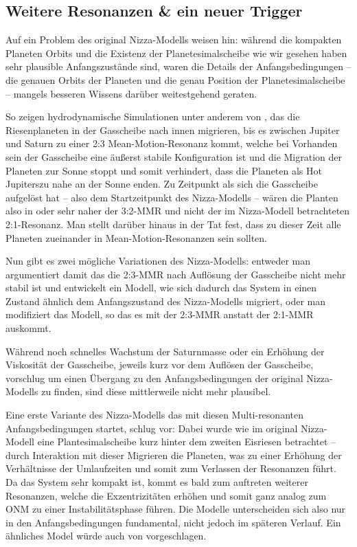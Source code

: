 \documentclass[12pt,a4paper,twoside]{article}
\renewcommand{\cite}{\citep}
\begin{document}
\subsection{Weitere Resonanzen \& ein neuer Trigger}\label{Nizza2}
Auf ein Problem des original Nizza-Modells weisen \cite{Morbidelli2007a} hin: während die kompakten Planeten Orbits und die Existenz der Planetesimalscheibe wie wir gesehen haben sehr plausible Anfangszustände sind, waren die Details der Anfangsbedingungen -- die genauen Orbits der Planeten und die genau Position der Planetesimalscheibe -- mangels besseren Wissens darüber weitestgehend geraten.

So zeigen hydrodynamische Simulationen unter anderem von \cite{Morbidelli2007a}, das die Riesenplaneten in der Gasscheibe nach innen migrieren, bis es zwischen Jupiter und Saturn zu einer 2:3 Mean-Motion-Resonanz kommt, welche bei Vorhanden sein der Gasscheibe eine äußerst stabile Konfiguration ist und die Migration der Planeten zur Sonne stoppt und somit verhindert, dass die Planeten als \glqq Hot Jupiters\grqq zu nahe an der Sonne enden\cite{Morbidelli2007a}.
Zu Zeitpunkt als sich die Gasscheibe aufgelöst hat -- also dem Startzeitpunkt des Nizza-Modells -- wären die Planten also in oder sehr naher der 3:2-MMR und nicht der im Nizza-Modell betrachteten 2:1-Resonanz.
Man stellt darüber hinaus in der Tat fest, dass zu dieser Zeit alle Planeten zueinander in Mean-Motion-Resonanzen sein sollten.

Nun gibt es zwei mögliche Variationen des Nizza-Modells: entweder man argumentiert damit das die 2:3-MMR nach Auflösung der Gasscheibe nicht mehr stabil ist und entwickelt ein Modell, wie sich dadurch das System in einen Zustand ähnlich dem Anfangszustand des Nizza-Modells migriert, oder man modifiziert das Modell, so das es mit der  2:3-MMR anstatt der 2:1-MMR auskommt. %

Während \cite{Morbidelli2007a} noch schnelles Wachstum der Saturnmasse oder ein Erhöhung der Viskosität der Gasscheibe, jeweils kurz vor dem Auflösen der Gasscheibe, vorschlug um einen Übergang zu den Anfangsbedingungen der original Nizza-Modells zu finden, sind diese mittlerweile nicht mehr plausibel. %

Eine erste Variante des Nizza-Modells das mit diesen Multi-resonanten Anfangsbedingungen startet, schlug \cite{Morbidelli2007b} vor:
Dabei wurde wie im original Nizza-Modell eine Plantesimalscheibe kurz hinter dem zweiten Eisriesen betrachtet -- durch Interaktion mit dieser Migrieren die Planeten, was zu einer Erhöhung der Verhältnisse der Umlaufzeiten und somit zum Verlassen der Resonanzen führt.
Da das System sehr kompakt ist, kommt es bald zum auftreten weiterer Resonanzen, welche die Exzentrizitäten erhöhen und somit ganz analog zum ONM zu einer Instabilitätsphase führen. Die Modelle unterscheiden sich also nur in den Anfangsbedingungen fundamental, nicht jedoch im späteren Verlauf.
Ein ähnliches Model würde auch von \cite{Batygin2010} vorgeschlagen.
\end{document}
